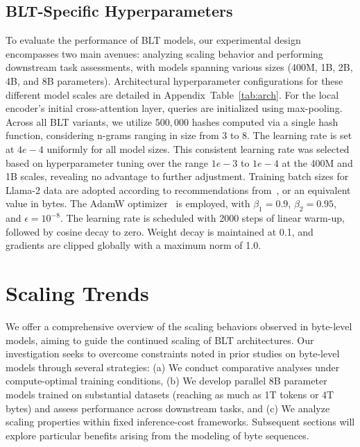 \subsection{{\textsc BLT}-Specific Hyperparameters} To evaluate the performance of {\textsc BLT} models, our experimental design encompasses two main avenues: analyzing scaling behavior and performing downstream task assessments, with models spanning various sizes (400M, 1B, 2B, 4B, and 8B parameters). Architectural hyperparameter configurations for these different model scales are detailed in Appendix~Table~\ref{tab:arch}. For the local encoder's initial cross-attention layer, queries are initialized using max-pooling. Across all {\textsc BLT} variants, we utilize $500,000$ hashes computed via a single hash function, considering n-grams ranging in size from 3 to 8. The learning rate is set at $4e-4$ uniformly for all model sizes. This consistent learning rate was selected based on hyperparameter tuning over the range $1e-3$ to $1e-4$ at the 400M and 1B scales, revealing no advantage to further adjustment. Training batch sizes for Llama-2 data are adopted according to recommendations from~\cite{dubey2024llama}, or an equivalent value in bytes. The AdamW optimizer~\citep{adamw} is employed, with $\beta_1 = 0.9$, $\beta_2 = 0.95$, and $\epsilon = 10^{-8}$. The learning rate is scheduled with 2000 steps of linear warm-up, followed by cosine decay to zero. Weight decay is maintained at 0.1, and gradients are clipped globally with a maximum norm of 1.0.

\section{Scaling Trends}
\label{section:scaling}

We offer a comprehensive overview of the scaling behaviors observed in byte-level models, aiming to guide the continued scaling of {\textsc BLT} architectures. Our investigation seeks to overcome constraints noted in prior studies on byte-level models through several strategies: (a) We conduct comparative analyses under compute-optimal training conditions, (b) We develop parallel 8B parameter models trained on substantial datasets (reaching as much as 1T tokens or 4T bytes) and assess performance across downstream tasks, and (c) We analyze scaling properties within fixed inference-cost frameworks. Subsequent sections will explore particular benefits arising from the modeling of byte sequences.

